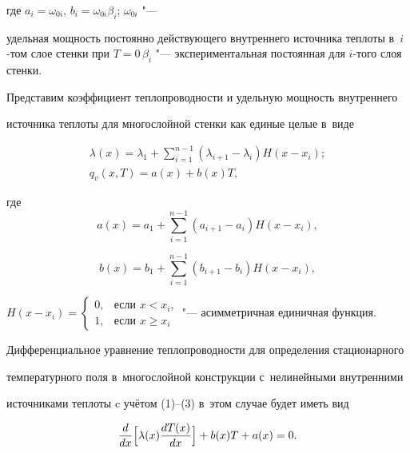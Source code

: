 где $a_i =\omega _{0i} $, $b_i =\omega _{0i} \beta _i $; $\omega _{0i} $ "---

удельная мощность постоянно действующего внутреннего источника теплоты в~$i$-том слое стенки при $T= 0$\, $\beta _i $ "--- экспериментальная постоянная для $i$-того слоя стенки.



Представим коэффициент теплопроводности и удельную мощность внутреннего

источника теплоты для многослойной стенки как единые целые в~виде

\begin{gather}

\label{av:104:eq2}

\lambda (x)=\lambda _1 +\sum\limits_{i=1}^{n-1} (\lambda _{i+1} -\lambda _i) H(x-x_i );

\\

\label{av:104:eq3}

 q_ v (x, T)=a(x)+b(x)T,

\end{gather}

где $$a(x)=a_1 +\sum\limits_{i=1}^{n-1} {(a_{i+1} -a_i )} H(x-x_i ),$$

$$b(x)=b_1 +\sum\limits_{i=1}^{n-1} {(b_{i+1} -b_i )} H(x-x_i ),$$

$

H(x-x_i )=\left\{ \begin{array}{ll}

 0,&\text{если $x<x_i$,}\\

 1,&\text{если  $x\geqslant x_i$}

 \end{array} \right.

$ "--- асимметричная единичная функция.





Дифференциальное уравнение теплопроводности для определения стационарного

температурного поля в~многослойной конструкции с~нелинейными внутренними

источниками теплоты c учётом (1)--(3) в~этом случае будет иметь вид

\begin{equation}

\label{av:104:eq4}

\frac{d}{dx}\Bigl[\lambda (x)\frac{dT(x)}{dx}\Bigr]+b(x)T+a(x)=0.

\end{equation}



